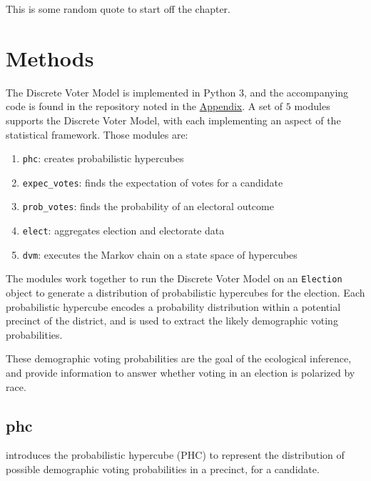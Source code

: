 \begin{savequote}[75mm]
This is some random quote to start off the chapter.
\end{savequote}

\chapter{Methods}

The Discrete Voter Model is implemented in Python 3, and the accompanying code is found in the repository noted in the \hyperref[chap:appendix]{Appendix}. A set of $5$ modules supports the Discrete Voter Model, with each implementing an aspect of the statistical framework. Those modules are:

\begin{enumerate}
  \item \texttt{phc}: creates probabilistic hypercubes
  \item \texttt{expec\_votes}: finds the expectation of votes for a candidate
  \item \texttt{prob\_votes}: finds the probability of an electoral outcome
  \item \texttt{elect}: aggregates election and electorate data
  \item \texttt{dvm}: executes the Markov chain on a state space of hypercubes
\end{enumerate}

The modules work together to run the Discrete Voter Model on an \texttt{Election} object to generate a distribution of probabilistic hypercubes for the election. Each probabilistic hypercube encodes a probability distribution within a potential precinct of the district, and is used to extract the likely demographic voting probabilities.

These demographic voting probabilities are the goal of the ecological inference, and provide information to answer whether voting in an election is polarized by race.

\section{phc}
\label{sec:phc}

 introduces the probabilistic hypercube (PHC) to represent the distribution of possible demographic voting probabilities in a precinct, for a candidate.

